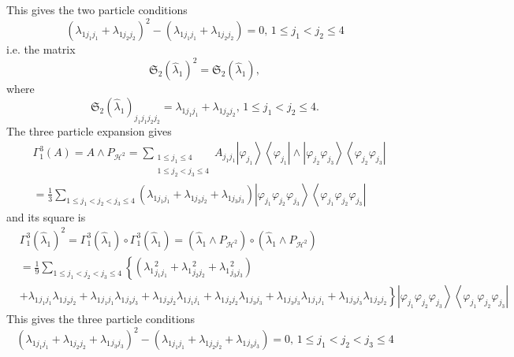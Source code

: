 \documentclass[aps,preprint]{revtex4}%
\begin{document}
This gives the two particle conditions%
\[
\left(  \lambda_{1j_{1}j_{1}}+\lambda_{1j_{2}j_{2}}\right)  ^{2}-\left(
\lambda_{1j_{1}j_{1}}+\lambda_{1j_{2}j_{2}}\right)  =0,\,1\leq j_{1}<j_{2}%
\leq4
\]
i.e. the matrix
\[
\mathfrak{S}_{2}\left(  \hat{\lambda}_{1}\right)  ^{2}=\mathfrak{S}_{2}\left(
\hat{\lambda}_{1}\right)  ,
\]
where
\[
\mathfrak{S}_{2}\left(  \hat{\lambda}_{1}\right)  _{j_{1}j_{1}j_{2}j_{2}%
}=\lambda_{1j_{1}j_{1}}+\lambda_{1j_{2}j_{2}},\,1\leq j_{1}<j_{2}\leq4.
\]
The three particle expansion gives
\begin{align*}
&  \Gamma_{1}^{3}\left(  A\right)  =A\wedge P_{\mathcal{H}^{2}}=\sum
_{\substack{1\leq j_{1}\leq4\\1\leq j_{2}<j_{3}\leq4}}A_{j_{1}j_{1}}\left\vert
\varphi_{j_{1}}\right\rangle \left\langle \varphi_{j_{1}}\right\vert
\wedge\left\vert \varphi_{j_{2}}\varphi_{j_{3}}\right\rangle \left\langle
\varphi_{j_{2}}\varphi_{j_{3}}\right\vert \\
&  =\frac{1}{3}\sum_{1\leq j_{1}<j_{2}<j_{3}\leq4}\left(  \lambda_{1j_{1}%
j_{1}}+\lambda_{1j_{2}j_{2}}+\lambda_{1j_{3}j_{3}}\right)  \left\vert
\varphi_{j_{1}}\varphi_{j_{2}}\varphi_{j_{3}}\right\rangle \left\langle
\varphi_{j_{1}}\varphi_{j_{2}}\varphi_{j_{3}}\right\vert
\end{align*}
and its square is
\begin{align*}
&  \Gamma_{1}^{3}\left(  \hat{\lambda}_{1}\right)  ^{2}=\Gamma_{1}^{3}\left(
\hat{\lambda}_{1}\right)  \circ\Gamma_{1}^{3}\left(  \hat{\lambda}_{1}\right)
=\left(  \hat{\lambda}_{1}\wedge P_{\mathcal{H}^{2}}\right)  \circ\left(
\hat{\lambda}_{1}\wedge P_{\mathcal{H}^{2}}\right) \\
&  =\frac{1}{9}\sum_{1\leq j_{1}<j_{2}<j_{3}\leq4}\left\{  \left(  \lambda
_{1}{}_{j_{1}j_{1}}^{2}+\lambda_{1}{}_{j_{2}j_{2}}^{2}+\lambda_{1}{}%
_{j_{3}j_{3}}^{2}\right)  \right. \\
&  +\lambda_{1}{}_{j_{1}j_{1}}\lambda_{1}{}_{j_{2}j_{2}}+\lambda_{1}{}%
_{j_{1}j_{1}}\lambda_{1}{}_{j_{3}j_{3}}+\lambda_{1}{}_{j_{2}j_{2}}\lambda
_{1}{}_{j_{1}j_{1}}+\lambda_{1}{}_{j_{2}j_{2}}\lambda_{1}{}_{j_{3}j_{3}%
}+\left.  \lambda_{1}{}_{j_{3}j_{3}}\lambda_{1}{}_{j_{1}j_{1}}+\lambda_{1}%
{}_{j_{3}j_{3}}\lambda_{1}{}_{j_{2}j_{2}}\right\}  \left\vert \varphi_{j_{1}%
}\varphi_{j_{2}}\varphi_{j_{3}}\right\rangle \left\langle \varphi_{j_{1}%
}\varphi_{j_{2}}\varphi_{j_{3}}\right\vert
\end{align*}
This gives the three particle conditions%
\[
\left(  \lambda_{1j_{1}j_{1}}+\lambda_{1j_{2}j_{2}}+\lambda_{1}{}_{j_{3}j_{3}%
}\right)  ^{2}-\left(  \lambda_{1j_{1}j_{1}}+\lambda_{1j_{2}j_{2}}+\lambda
_{1}{}_{j_{3}j_{3}}\right)  =0,\,1\leq j_{1}<j_{2}<j_{3}\leq4
\]
\end{document}
